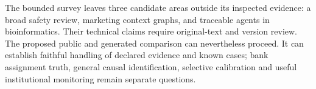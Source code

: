The bounded survey leaves three candidate areas outside its inspected evidence:
a broad safety review, marketing context graphs, and traceable agents in
bioinformatics. Their technical claims require original-text and version review.
The proposed public and generated comparison can nevertheless proceed. It can
establish faithful handling of declared evidence and known cases; bank assignment
truth, general causal identification, selective calibration and useful
institutional monitoring remain separate questions.
\citep{exec16_report_contract}
\label{exec16:reporting-end}
